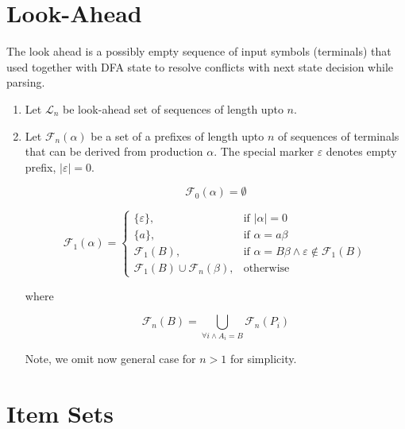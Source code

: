 \section{Look-Ahead}
\def\L{\mathcal{L}}
\def\F{\mathcal{F}}
\def\e{\varepsilon}
\def\J{\mathcal{J}}

The look ahead is a possibly empty sequence of input symbols (terminals)
that used together with DFA state to resolve conflicts with next state
decision while parsing.

\begin{enumerate}

\item	Let $\L_n$ be look-ahead set of sequences of length upto $n$.

\item	Let $\F_n(\alpha)$ be a set of a prefixes of length upto $n$ of
	sequences of terminals that can be derived from production
	$\alpha$. The special marker $\e$ denotes empty prefix, $|\e| = 0$.

	$$
	\F_0(\alpha) = \emptyset
	$$

	$$
	\F_1(\alpha) =
	\begin{cases}
		\{ \e \},	& \text{if } |\alpha| = 0		\\
		\{ a  \},	& \text{if } \alpha = a \beta		\\
		\F_1(B),	& \text{if }
			\alpha = B \beta \wedge \e \not \in \F_1(B)	\\
		\F_1(B) \cup \F_n(\beta),
				& \text{otherwise}
	\end{cases}
	$$

	where

	$$
	\F_n(B) = \bigcup_{\forall i \wedge A_i = B} \F_n(P_i)
	$$

	Note, we omit now general case for $n > 1$ for simplicity.
\end{enumerate}

\section{Item Sets}
\def\I{\mathcal{I}}
\def\S{\mathcal{S}}
\def\G{\mathcal{G}}

